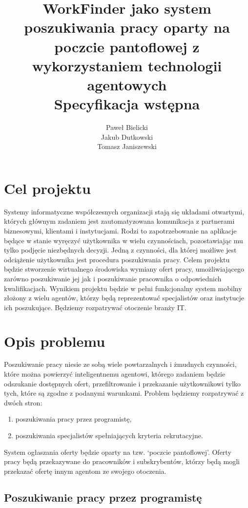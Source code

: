 \documentclass[11pt,a4paper]{article}
\author{
	Paweł Bielicki\\
	Jakub Dutkowski\\
	Tomasz Janiszewski
}
\title{
	\huge{WorkFinder jako system poszukiwania pracy oparty na poczcie pantoflowej z wykorzystaniem technologii agentowych}\\
	\LARGE{Specyfikacja wstępna}
 }
\begin{document}
\maketitle

\listoftodos
\newpage

\section{Cel projektu}
Systemy informatyczne współczesnych organizacji stają się układami otwartymi, których głównym zadaniem jest zautomatyzowana komunikacja z partnerami biznesowymi, klientami i instytucjami. Rodzi to zapotrzebowanie na aplikacje będące w stanie wyręczyć użytkownika w wielu czynnościach, pozostawiając mu tylko podjęcie niezbędnych decyzji.
Jedną z czynności, dla której możliwe jest odciążenie użytkownika jest procedura poszukiwania pracy. Celem projektu będzie stworzenie wirtualnego środowiska wymiany ofert pracy, umożliwiającego zarówno poszukiwanie jej jak i poszukiwanie pracownika o odpowiednich kwalifikacjach.
Wynikiem projektu będzie w pełni funkcjonalny system mobilny złożony z wielu agentów, którzy będą reprezentować specjalistów oraz instytucje ich poszukujące. Będziemy rozpatrywać otoczenie branży IT.

\section{Opis problemu}

Poszukiwanie pracy niesie ze sobą wiele powtarzalnych i żmudnych czynności, które można powierzyć inteligentnemu agentowi, którego zadaniem będzie odszukanie dostępnych ofert, przefiltrowanie i przekazanie użytkownikowi tylko tych, które są zgodne z podanymi warunkami.
Problem będziemy rozpatrywać z dwóch stron:
\begin{enumerate}
	\item poszukiwania pracy przez programistę,
	\item poszukiwania specjalistów spełniających kryteria rekrutacyjne.
\end{enumerate}

System ogłaszania oferty będzie oparty na tzw. `poczcie pantoflowej'. Oferty pracy będą przekazywane do pracowników i subskrybentów, którzy będą mogli przekazać ofertę innym agentom ze swojego otoczenia.


\subsection{Poszukiwanie pracy przez programistę}
\end{document}

